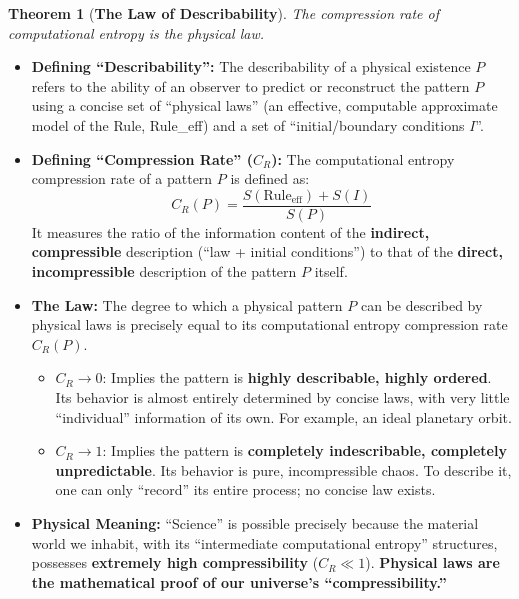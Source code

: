 \documentclass[11pt, a4paper]{article}
\newtheorem{theorem}{Theorem}[section]
\begin{document}
\begin{theorem}[\textbf{The Law of Describability}]
The compression rate of computational entropy is the physical law.
\end{theorem}
\begin{itemize}
    \item \textbf{Defining ``Describability'':} The describability of a physical existence $P$ refers to the ability of an observer to predict or reconstruct the pattern $P$ using a concise set of ``physical laws'' (an effective, computable approximate model of the Rule, Rule\_eff) and a set of ``initial/boundary conditions $I$''.
    \item \textbf{Defining ``Compression Rate'' ($C_R$):} The computational entropy compression rate of a pattern $P$ is defined as:
    \[
    C_R(P) = \frac{S(\text{Rule}_{\text{eff}}) + S(I)}{S(P)}
    \]
    It measures the ratio of the information content of the \textbf{indirect, compressible} description (``law + initial conditions'') to that of the \textbf{direct, incompressible} description of the pattern $P$ itself.
    \item \textbf{The Law:} The degree to which a physical pattern $P$ can be described by physical laws is precisely equal to its computational entropy compression rate $C_R(P)$.
    \begin{itemize}
        \item \textbf{$C_R \to 0$}: Implies the pattern is \textbf{highly describable, highly ordered}. Its behavior is almost entirely determined by concise laws, with very little ``individual'' information of its own. For example, an ideal planetary orbit.
        \item \textbf{$C_R \to 1$}: Implies the pattern is \textbf{completely indescribable, completely unpredictable}. Its behavior is pure, incompressible chaos. To describe it, one can only ``record'' its entire process; no concise law exists.
    \end{itemize}
    \item \textbf{Physical Meaning:} ``Science'' is possible precisely because the material world we inhabit, with its ``intermediate computational entropy'' structures, possesses \textbf{extremely high compressibility} ($C_R \ll 1$). \textbf{Physical laws are the mathematical proof of our universe's ``compressibility.''}
\end{itemize}
\end{document}
